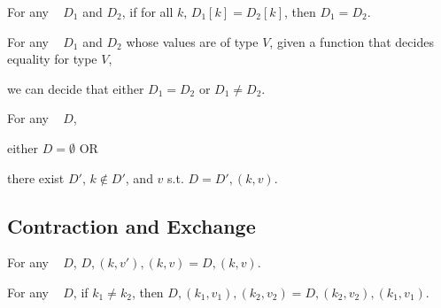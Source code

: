 \begin{proposition}[\SemTot]

\breakAndIndent
%

\end{proposition}

\begin{theorem}[\SemInj]
\label{thm:SemInj}

\breakAndIndent
%
For any \dds~ $D_1$ and $D_2$,
%
if for all $k$, $D_1[k] = D_2[k]$,
%
then $D_1 = D_2$.

\end{theorem}

\begin{theorem}[\EqDec]
\label{thm:EqDec}

\breakAndIndent
%
For any \dds~ $D_1$ and $D_2$ whose values are of type $V$,
%
given a function that decides equality for type $V$,
%

\justIndent
%
we can decide that either $D_1 = D_2$ or $D_1 \ne D_2$.

\end{theorem}

\begin{theorem}[\EzDstr]
\label{thm:EzDstr}

\breakAndIndent
%
For any \dd~ $D$,

\justIndent \quad
%
either $D = \emptyset$ OR

\justIndent \quad
%
there exist $D'$, $k \notin D'$, and $v$
%
s.t. $D = D' , (k, v)$.

\end{theorem}

\subsection{Contraction and Exchange}


\begin{theorem}
\label{thm:cont-dicts}

\breakAndIndent
%
For any {\dd}~ $D$,
%
$D, (k, v'), (k, v) = D, (k, v)$.

\end{theorem}

\begin{theorem}
\label{thm:exch-dicts}

\breakAndIndent
%
For any {\dd}~ $D$,
%
if $k_1 \ne k_2$, then
%
$D, (k_1, v_1), (k_2, v_2) = D, (k_2, v_2), (k_1, v_1)$.

\end{theorem}
